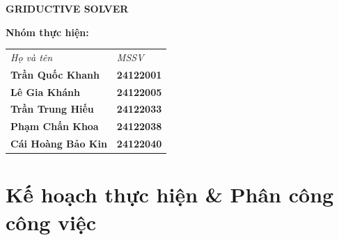 \documentclass{article}
\begin{document}
\begin{titlepage}
\begin{center}
    {\fontsize{24pt}{28pt}\selectfont\textbf{\textcolor{primarycolor}{GRIDUCTIVE SOLVER}}}
\end{center}

\begin{flushright}
\begin{center}
    \textbf{Nhóm thực hiện:}
    \vspace{1pt}
    
    \renewcommand{\arraystretch}{1.3}
    {\small
    \begin{tabular}{l @{\hspace{1.5cm}} l} 
        \textit{\small Họ và tên} & \textit{\small MSSV} \\
        \textbf{Trần Quốc Khanh}    & \textbf{24122001} \\
        \textbf{Lê Gia Khánh}       & \textbf{24122005} \\
        \textbf{Trần Trung Hiếu}    & \textbf{24122033} \\
        \textbf{Phạm Chấn Khoa}     & \textbf{24122038} \\
        \textbf{Cái Hoàng Bảo Kin}  & \textbf{24122040} \\
    \end{tabular}
    }
\end{center}
\end{flushright}
\end{titlepage}
\hypersetup{pageanchor=true}

\tableofcontents
\newpage

\section{Kế hoạch thực hiện \& Phân công công việc}
\end{document}
